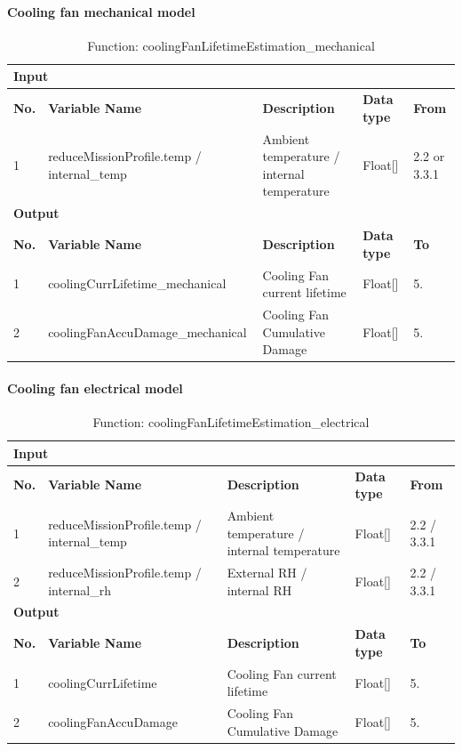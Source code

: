 \documentclass{article}
\begin{document}
\paragraph{Cooling fan mechanical model}
\begin{table}[h]
\centering
\caption{Function: coolingFanLifetimeEstimation\_mechanical}
\begin{tabular}{|l|p{4cm}|p{4cm}|l|l|}
\hline
\multicolumn{5}{|l|}{\textbf{Input}} \\ \hline
\textbf{No.} & \textbf{Variable Name} & \textbf{Description} & \textbf{Data type} & \textbf{From} \\ \hline
1 & reduceMissionProfile.temp / internal\_temp & Ambient temperature / internal temperature & Float[] & 2.2 or 3.3.1 \\ \hline
\multicolumn{5}{|l|}{\textbf{Output}} \\ \hline
\textbf{No.} & \textbf{Variable Name} & \textbf{Description} & \textbf{Data type} & \textbf{To} \\ \hline
1 & coolingCurrLifetime\_mechanical & Cooling Fan current lifetime & Float[] & 5. \\ \hline
2 & coolingFanAccuDamage\_mechanical & Cooling Fan Cumulative Damage & Float[] & 5. \\ \hline
\end{tabular}
\end{table}

\paragraph{Cooling fan electrical model}
\begin{table}[h]
\centering
\caption{Function: coolingFanLifetimeEstimation\_electrical}
\begin{tabular}{|l|p{4cm}|p{4cm}|l|l|}
\hline
\multicolumn{5}{|l|}{\textbf{Input}} \\ \hline
\textbf{No.} & \textbf{Variable Name} & \textbf{Description} & \textbf{Data type} & \textbf{From} \\ \hline
1 & reduceMissionProfile.temp / internal\_temp & Ambient temperature / internal temperature & Float[] & 2.2 / 3.3.1 \\ \hline
2 & reduceMissionProfile.temp / internal\_rh & External RH / internal RH & Float[] & 2.2 / 3.3.1 \\ \hline
\multicolumn{5}{|l|}{\textbf{Output}} \\ \hline
\textbf{No.} & \textbf{Variable Name} & \textbf{Description} & \textbf{Data type} & \textbf{To} \\ \hline
1 & coolingCurrLifetime & Cooling Fan current lifetime & Float[] & 5. \\ \hline
2 & coolingFanAccuDamage & Cooling Fan Cumulative Damage & Float[] & 5. \\ \hline
\end{tabular}
\end{table}
\end{document}
